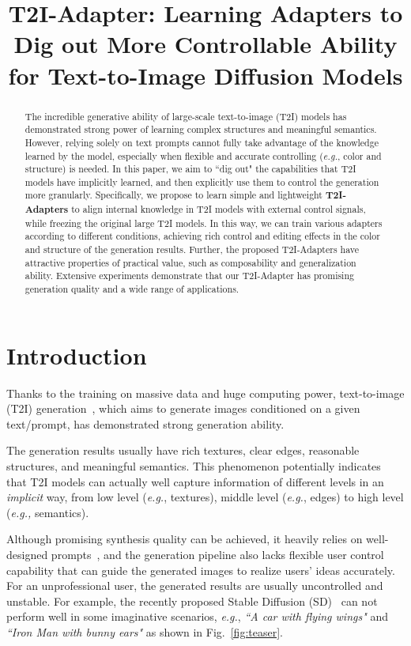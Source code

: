 \title{T2I-Adapter: Learning Adapters to Dig out More Controllable Ability for Text-to-Image Diffusion Models}

\begin{abstract}
The incredible generative ability of large-scale text-to-image (T2I) models has demonstrated strong power of learning complex structures and meaningful semantics. However, relying solely on text prompts cannot fully take advantage of the knowledge learned by the model, especially when flexible and accurate controlling (\textit{e.g.}, color and structure) is needed. In this paper, we aim to ``dig out" the capabilities that T2I models have implicitly learned, and then explicitly use them to control the generation more granularly. Specifically, we propose to learn simple and lightweight \textbf{T2I-Adapters} to align internal knowledge in T2I models with external control signals, while freezing the original large T2I models. In this way, we can train various adapters according to different conditions, achieving rich control and editing effects in the color and structure of the generation results. Further, the proposed T2I-Adapters have attractive properties of practical value, such as composability and generalization ability. Extensive experiments demonstrate that our T2I-Adapter has promising generation quality and a wide range of applications.
\end{abstract}

\section{Introduction}

Thanks to the training on massive data and huge computing power, text-to-image (T2I) generation~\cite{t2i1,ldm,glid,t2i2,t2i3,t2i4,t2i5}, which aims to generate images conditioned on a given text/prompt, has demonstrated strong generation ability.

The generation results usually have rich textures, clear edges, reasonable structures, and meaningful semantics. This phenomenon potentially indicates that T2I models can actually well capture information of different levels in an \textit{implicit} way, from low level (\textit{e.g.}, textures), middle level (\textit{e.g.}, edges) to high level (\textit{e.g.,} semantics).

Although promising synthesis quality can be achieved, it heavily relies on well-designed prompts~\cite{good_prompt1, good_prompt2}, and the generation pipeline also lacks flexible user control capability that can guide the generated images to realize users' ideas accurately. For an unprofessional user, the generated results are usually uncontrolled and unstable. For example, the recently proposed Stable Diffusion (SD)~\cite{ldm} can not perform well in some imaginative scenarios, \textit{e.g.}, \textit{``A car with flying wings"} and \textit{``Iron Man with bunny ears"} as shown in Fig.~\ref{fig:teaser}. 

